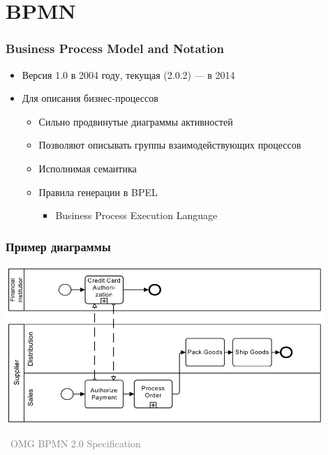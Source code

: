 \documentclass[xetex,mathserif,serif]{beamer}
\newcommand{\attribution}[1] {
    \vspace{-5mm}\begin{flushright}\begin{scriptsize}\textcolor{gray}{\textcopyright\, #1}\end{scriptsize}\end{flushright}
}
\begin{document}

    \section{BPMN}

    \begin{frame}
        \frametitle{Business Process Model and Notation}
        \begin{itemize}
            \item Версия 1.0 в 2004 году, текущая (2.0.2) --- в 2014
            \item Для описания бизнес-процессов
            \begin{itemize}
                \item Сильно продвинутые диаграммы активностей
                \item Позволяют описывать группы взаимодействующих процессов
                \item Исполнимая семантика
                \item Правила генерации в BPEL
                \begin{itemize}
                    \item Business Process Execution Language
                \end{itemize}
            \end{itemize}
        \end{itemize}
    \end{frame}

    \begin{frame}
        \frametitle{Пример диаграммы}
        \begin{center}
            \includegraphics[width=0.9\textwidth]{bpmnExample.png}
            \attribution{OMG BPMN 2.0 Specification}
        \end{center}
    \end{frame}
\end{document}
